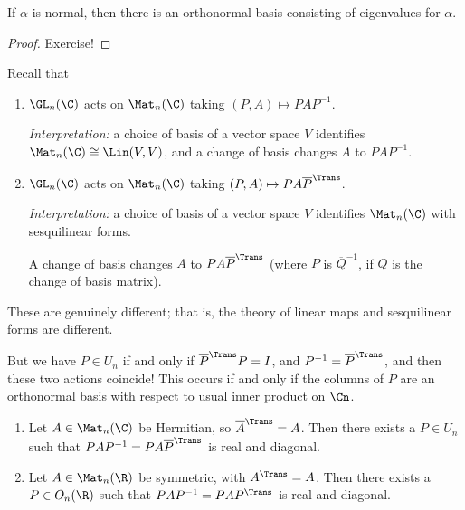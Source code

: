 \begin{theorem}
	If $\alpha$ is normal, then there is an orthonormal basis consisting of eigenvalues for $\alpha$. 
\end{theorem}
\begin{proof} Exercise!
\end{proof}

Recall that
\begin{enumerate}
	\item $\GL_n(\C)$ acts on $\Mat_n(\C)$ taking $(P,A) \mapsto PAP^{-1}$. %
	
	\emph{Interpretation:} a choice of basis of a vector space $V$ identifies $\Mat_n(\C) \cong \Lin(V,V)$, and a change of basis changes $A$ to $PAP^{-1}$. %
	
	\item $\GL_n(\C)$ acts on $\Mat_n(\C)$ taking $(P,A) \mapsto PA\overline{P}^\Trans$. %
	
	\emph{Interpretation:} a choice of basis of a vector space $V$ identifies $\Mat_n(\C)$ with sesquilinear forms. %
	
	A change of basis changes $A$ to $PA\overline{P}^\Trans$ (where $P$ is $\overline{Q}^{-1}$, if $Q$ is the change of basis matrix). %
\end{enumerate}
These are genuinely different; that is, the theory of linear maps and sesquilinear forms are different.

But we have $P\in U_n$ if and only if $\overline{P}^\Trans P=I$, and $P^{-1}=\overline{P}^\Trans$, and then these two actions coincide! This occurs if and only if the columns of $P$ are an orthonormal basis with respect to usual inner product on $\Cn$.

\begin{proposition}
\mbox{}
\begin{enumerate}
	\shortskip
	\item Let $A\in\Mat_n(\C)$ be Hermitian, so $\herm{A}=A$. Then there exists a $P\in U_n$ such that $PAP^{-1} = PA\overline{P}^\Trans$ is real and diagonal. %
	\item Let $A\in\Mat_n (\R)$ be symmetric, with $A^\Trans = A$. Then there exists a $P\in O_n(\R)$ such that $PAP^{-1}=PAP^\Trans$ is real and diagonal. %
\end{enumerate}
\end{proposition}

